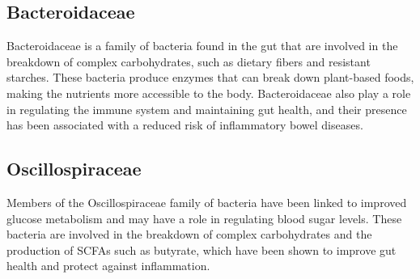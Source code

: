 \documentclass[
  twocolumn]{article}
\begin{document}
\subsection{Bacteroidaceae}

\begin{small}
Bacteroidaceae is a family of bacteria found in the gut that are involved in the
breakdown of complex carbohydrates, such as dietary fibers and resistant 
starches. These bacteria produce enzymes that can break down plant-based foods, 
making the nutrients more accessible to the body. Bacteroidaceae also play a 
role in regulating the immune system and maintaining gut health, and their 
presence has been associated with a reduced risk of inflammatory bowel diseases.
\end{small}

\subsection{Oscillospiraceae}

\begin{small}
Members of the Oscillospiraceae family of bacteria have been linked to improved 
glucose metabolism and may have a role in regulating blood sugar levels. These 
bacteria are involved in the breakdown of complex carbohydrates and the 
production of SCFAs such as butyrate, which have been shown to improve gut 
health and protect against inflammation.
\end{small}
\end{document}
